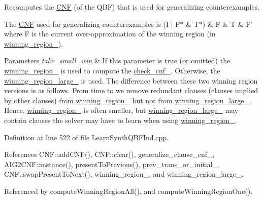 Recomputes the \hyperlink{classCNF}{C\-N\-F} (of the Q\-B\-F) that is used for generalizing counterexamples. 

The \hyperlink{classCNF}{C\-N\-F} used for generalizing counterexamples is (I $|$ F$\ast$ \& T$\ast$) \& F \& T \& F' where F is the current over-\/approximation of the winning region (in \hyperlink{classLearnSynthQBFInd_ab8ce6031137413e90e0626bbdc734be0}{winning\-\_\-region\-\_\-}).


\begin{DoxyParams}{Parameters}
{\em take\-\_\-small\-\_\-win} & If this parameter is true (or omitted) the \hyperlink{classLearnSynthQBFInd_ab8ce6031137413e90e0626bbdc734be0}{winning\-\_\-region\-\_\-} is used to compute the \hyperlink{classLearnSynthQBFInd_ac90a4574da82c96888db219291368554}{check\-\_\-cnf\-\_\-}. Otherwise, the \hyperlink{classLearnSynthQBFInd_a333c9336ba28a2c41f252a3051a59581}{winning\-\_\-region\-\_\-large\-\_\-} is used. The difference between these two winning region versions is as follows. From time to we remove redundant clauses (clauses implied by other clauses) from \hyperlink{classLearnSynthQBFInd_ab8ce6031137413e90e0626bbdc734be0}{winning\-\_\-region\-\_\-} but not from \hyperlink{classLearnSynthQBFInd_a333c9336ba28a2c41f252a3051a59581}{winning\-\_\-region\-\_\-large\-\_\-}. Hence, \hyperlink{classLearnSynthQBFInd_ab8ce6031137413e90e0626bbdc734be0}{winning\-\_\-region\-\_\-} is often smaller, but \hyperlink{classLearnSynthQBFInd_a333c9336ba28a2c41f252a3051a59581}{winning\-\_\-region\-\_\-large\-\_\-} may contain clauses the solver may have to learn when using \hyperlink{classLearnSynthQBFInd_ab8ce6031137413e90e0626bbdc734be0}{winning\-\_\-region\-\_\-}. \\
\hline
\end{DoxyParams}


Definition at line 522 of file Learn\-Synth\-Q\-B\-F\-Ind.\-cpp.



References C\-N\-F\-::add\-C\-N\-F(), C\-N\-F\-::clear(), generalize\-\_\-clause\-\_\-cnf\-\_\-, A\-I\-G2\-C\-N\-F\-::instance(), present\-To\-Previous(), prev\-\_\-trans\-\_\-or\-\_\-initial\-\_\-, C\-N\-F\-::swap\-Present\-To\-Next(), winning\-\_\-region\-\_\-, and winning\-\_\-region\-\_\-large\-\_\-.



Referenced by compute\-Winning\-Region\-All(), and compute\-Winning\-Region\-One().

